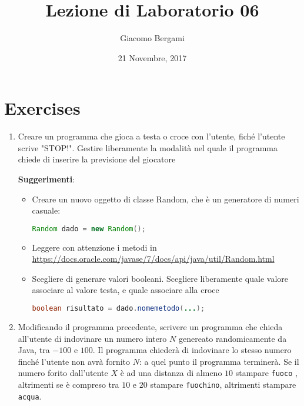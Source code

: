 \documentclass[]{scrartcl}
\title{Lezione di Laboratorio 06}
\date{21 Novembre, 2017}
\author{Giacomo Bergami}
\begin{document}
\maketitle
\section*{Exercises}

\begin{enumerate}
\item        Creare un programma che gioca a testa o croce con l'utente, fiché l'utente scrive "STOP!".
Gestire liberamente la modalità nel quale il programma chiede di inserire la previsione del giocatore

\textbf{Suggerimenti}:
\begin{itemize}
\item Creare un nuovo oggetto di classe Random, che è un generatore di numeri casuale:
\begin{lstlisting}[language=Java]
Random dado = new Random();
\end{lstlisting}
\item Leggere con attenzione i metodi in \url{https://docs.oracle.com/javase/7/docs/api/java/util/Random.html}
\item Scegliere di generare valori booleani. Scegliere liberamente quale valore associare al valore testa, e quale
associare alla croce
\begin{lstlisting}[language=Java]
boolean risultato = dado.nomemetodo(...);
\end{lstlisting}
\end{itemize}

\item        Modificando il programma precedente, scrivere un programma che chieda all'utente di indovinare un numero intero $N$
genereato randomicamente da Java, tra $-100$ e $100$. Il programma chiederà di indovinare lo stesso numero finché l'utente non
avrà fornito $N$: a quel punto il programma terminerà. Se il numero forito dall'utente $X$ è ad una distanza di almeno
$10$ stampare \texttt{fuoco} , altrimenti se è compreso tra $10$ e $20$ stampare \texttt{fuochino}, altrimenti stampare \texttt{acqua}.


\end{enumerate}
\end{document}
